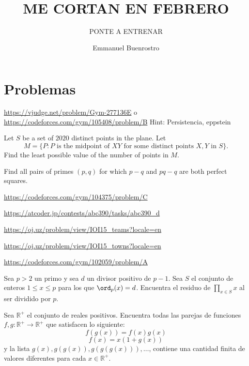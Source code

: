 \documentclass[11pt]{scrartcl}
\title{ME CORTAN EN FEBRERO }
\subtitle{PONTE A ENTRENAR}
\author{Emmanuel Buenrostro}
\begin{document}
\maketitle

\section{Problemas}
\begin{problem}[CF 277136E]
\url{https://vjudge.net/problem/Gym-277136E} o \url{https://codeforces.com/gym/105408/problem/B}
Hint: Persistencia, eppstein 
\end{problem}
\begin{problem}
Let $S$ be a set of $2020$ distinct points in the plane. Let
\[M=\{P:P\text{ is the midpoint of }XY\text{ for some distinct points }X,Y\text{ in }S\}.\]
Find the least possible value of the number of points in $M$.
\end{problem}
\begin{problem}[USAMO 2022/4]
Find all pairs of primes $(p, q)$ for which $p-q$ and $pq-q$ are both perfect squares.
\end{problem}
\begin{problem}
\url{https://codeforces.com/gym/104375/problem/C}
\end{problem}
\begin{problem}
\url{https://atcoder.jp/contests/abc390/tasks/abc390_d} 
\end{problem}
\begin{problem}
\url{https://oj.uz/problem/view/IOI15_teams?locale=en}
\end{problem}
\begin{problem}
\url{https://oj.uz/problem/view/IOI15_towns?locale=en}
\end{problem}
\begin{problem}
\url{https://codeforces.com/gym/102059/problem/A}
\end{problem}
\begin{problem}
Sea $p>2$ un primo y sea $d$ un divisor positivo de $p-1$. Sea $S$ el conjunto de enteros $1 \leq x \leq p$ para los que $\ord_p(x)=d$. Encuentra el residuo de $\prod_{x \in S} x$ al ser dividido por $p$.
\end{problem}
\begin{problem}
Sea $\mathbb{R}^{+}$ el conjunto de reales positivos. Encuentra todas las parejas de funciones $f,g: \mathbb{R}^{+} \rightarrow \mathbb{R}^{+}$
que satisfacen lo siguiente: 
\[f(g(x))=f(x)g(x)\]
\[f(x)=x(1+g(x))\]
y la lista $g(x), g(g(x)), g(g(g(x))), \ldots$, contiene una cantidad finita de valores diferentes para cada $x\in \mathbb{R}^{+}$.
\end{problem}
\end{document}
